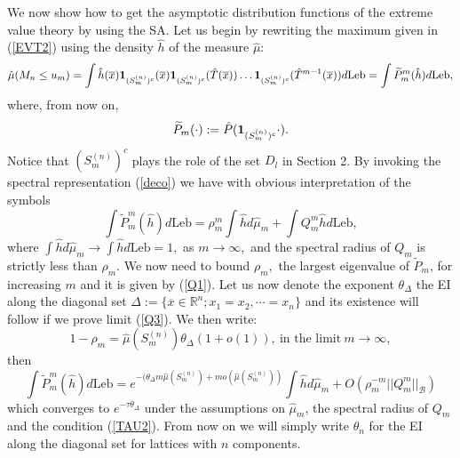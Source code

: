 \documentclass[12pt,reqno,a4paper]{amsart}
\let\tilde\widetilde
\newcommand{\T}{{\mathcal{T}}}
\def\Le{\text{Leb}}
\def\P{\hat{P}}
\def\T{\hat{T}}
\begin{document}
We now show how to get the asymptotic distribution functions of the extreme value theory by using the SA. Let us begin by rewriting
 the maximum given in (\ref{EVT2}) using the density $\hat{h}$ of the measure $\hat{\mu}$:
\begin{equation}\label{KT}
\hat{\mu}(M_n\le u_m)=\int \hat{h}(\overline{x}){\bf 1}_{(S^{(n)}_m)^c}(\overline{x}){\bf 1}_{(S^{(n)}_m)^c}(\T(\overline{x}))\dots {\bf 1}_{(S^{(n)}_m)^c}(\T^{m-1}(\overline{x}))d\Le=\int \tilde{P}^m_m(\hat{h}) d\Le,
\end{equation}
where, from now on,
$$
\tilde{P}_m(\cdot):=\P({\bf 1}_{(S^{(n)}_m)^c}\cdot).
$$
Notice that $(S^{(n)}_m)^c$ plays the role of the set $D_l$ in Section 2. By invoking the spectral representation (\ref{deco}) we have with obvious interpretation of the symbols
$$
\int \tilde{P}^m_m(\hat{h}) d\Le=\rho_m^m\int \hat{h}d\hat{\mu}_m+\int Q_m^m \hat{h}d\Le,
$$
where $\int \hat{h}d\hat{\mu}_m\rightarrow \int \hat{h}d\Le=1,$ as $m\rightarrow \infty,$ and the spectral radius of $Q_m$ is strictly less than $\rho_m.$
We now need  to bound $\rho_m,$ the largest eigenvalue of $\tilde{P}_m$, for increasing $m$ and it is given by  (\ref{Q1}).
Let us now denote the exponent $\theta_{\Delta}$  the EI along the diagonal set $\Delta:=\{\overline{x}\in \mathbb{R}^n; x_1=x_2,\cdots=x_n\}$ and its existence will follow if we prove  limit  (\ref{Q3}). We then write:
$$
1-\rho_m=\hat{\mu}(S^{(n)}_m) \theta_{\Delta} (1+o(1)), \ \text{in the limit} \ m\rightarrow \infty,
$$
then
\begin{equation}\label{PIV}
\int \tilde{P}^m_m(\hat{h}) d\Le=e^{-(\theta_{\Delta} m \hat{\mu}(S^{(n)}_m)+m o(\hat{\mu}(S^{(n)}_m))}\int \hat{h}d\hat{\mu}_m+O(\rho_m^{-m}||Q_m^m||_{\mathcal{B}})
\end{equation}
which converges to $e^{-\tau \theta_{\Delta}}$ under the assumptions on $\hat{\mu}_m$, the spectral radius of $Q_m$ and the condition (\ref{TAU2}). From now on  we will simply write $\theta_n$ for the EI along the diagonal set for lattices with $n$ components.\\
\end{document}
